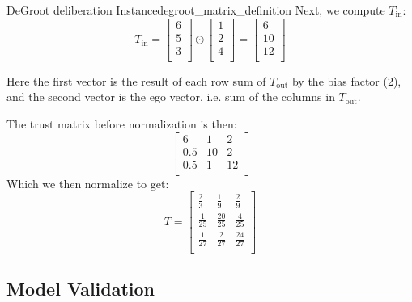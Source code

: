 \begin{example}{DeGroot deliberation Instance}{degroot_matrix_definition}
	Next, we compute $T_{\text{in}}$:
	$$T_{\text{in}} = \begin{bmatrix}
			6 \\
			5 \\
			3 \\
		\end{bmatrix} \odot
		\begin{bmatrix}
			1 \\
			2 \\
			4 \\
		\end{bmatrix} = \begin{bmatrix}
			6  \\
			10 \\
			12 \\
		\end{bmatrix} $$

	Here the first vector is the result of each row sum of $T_{\text{out}}$ by the bias factor (2), and the second vector is the ego vector, i.e. sum of the columns in $T_{\text{out}}$.

	The trust matrix before normalization is then:
	$$\begin{bmatrix}
			6   & 1  & 2  \\
			0.5 & 10 & 2  \\
			0.5 & 1  & 12 \\
		\end{bmatrix}$$
	Which we then normalize to get:
	$$T = \begin{bmatrix}
			\frac{2}{3}  & \frac{1}{9}   & \frac{2}{9}   \\
			\frac{1}{25} & \frac{20}{25} & \frac{4}{25}  \\
			\frac{1}{27} & \frac{2}{27}  & \frac{24}{27} \\
		\end{bmatrix}
	$$
\end{example}



\subsection{Model Validation}

